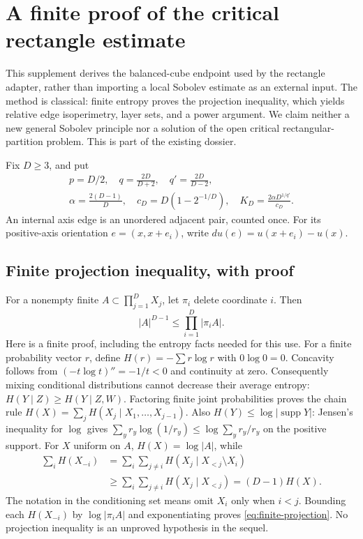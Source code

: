 \section{A finite proof of the critical rectangle estimate}
\label{sec:self-contained-box-sobolev}
This supplement derives the balanced-cube endpoint used by the rectangle
adapter, rather than importing a local Sobolev estimate as an external input.
The method is classical: finite entropy proves the projection inequality,
which yields relative edge isoperimetry, layer sets, and a power argument.
We claim neither a new general Sobolev principle nor a solution of the open
critical rectangular-partition problem. This is part of the existing dossier.

Fix $D\geq3$, and put
\[
 \begin{gathered}
 p=D/2,\quad q=\frac{2D}{D+2},\quad q'=\frac{2D}{D-2},\\
 \alpha=\frac{2(D-1)}D,\quad c_D=D(1-2^{-1/D}),\quad
 K_D=\frac{2\alpha D^{1/q'}}{c_D}.
 \end{gathered}
\]
An internal axis edge is an unordered adjacent pair, counted once. For its
positive-axis orientation $e=(x,x+e_i)$, write $du(e)=u(x+e_i)-u(x)$.

\subsection{Finite projection inequality, with proof}
For a nonempty finite $A\subset\prod_{j=1}^D X_j$, let $\pi_i$ delete
coordinate $i$. Then
\begin{equation}\label{eq:finite-projection}
 |A|^{D-1}\leq\prod_{i=1}^D|\pi_i A|.
\end{equation}
Here is a finite proof, including the entropy facts needed for this use.
For a finite probability vector $r$, define $H(r)=-\sum r\log r$ with
$0\log0=0$. Concavity follows from $(-t\log t)''=-1/t<0$ and continuity at
zero. Consequently mixing conditional distributions cannot decrease their
average entropy: $H(Y\mid Z)\geq H(Y\mid Z,W)$. Factoring finite joint
probabilities proves the chain rule
$H(X)=\sum_jH(X_j\mid X_1,\ldots,X_{j-1})$.
Also $H(Y)\leq\log|\operatorname{supp}Y|$: Jensen's inequality for $\log$
gives $\sum_y r_y\log(1/r_y)\leq\log\sum_y r_y/r_y$ on the positive support.
For $X$ uniform on $A$, $H(X)=\log|A|$, while
\[
 \begin{split}
 \sum_i H(X_{-i})
 &=\sum_i\sum_{j\ne i}H(X_j\mid X_{<j}\setminus X_i)\\
 &\geq\sum_i\sum_{j\ne i}H(X_j\mid X_{<j})
 =(D-1)H(X).
 \end{split}
\]
The notation in the conditioning set means omit $X_i$ only when $i<j$.
Bounding each $H(X_{-i})$ by $\log|\pi_i A|$ and exponentiating proves
\eqref{eq:finite-projection}. No projection inequality is an unproved
hypothesis in the sequel.

